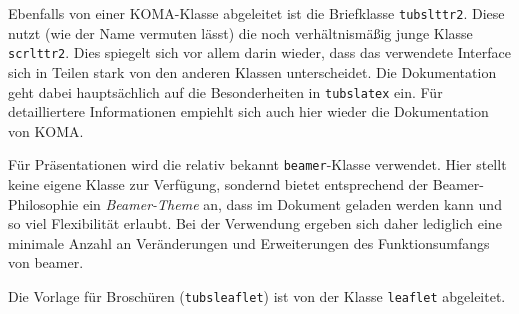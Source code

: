 Ebenfalls von einer KOMA-Klasse abgeleitet ist die Briefklasse
\texttt{tubslttr2}.
Diese nutzt (wie der Name vermuten lässt) die noch verhältnismäßig junge
Klasse \texttt{scrlttr2}. Dies spiegelt sich vor allem darin wieder, dass
das verwendete Interface sich in Teilen stark von den anderen Klassen unterscheidet. Die Dokumentation geht dabei hauptsächlich auf die Besonderheiten in \texttt{tubslatex} ein. Für detailliertere Informationen empiehlt sich auch hier wieder die Dokumentation von KOMA\cite{koma-skript}.

Für Präsentationen wird die relativ bekannt \texttt{beamer}-Klasse verwendet. Hier stellt \tubslatex keine eigene Klasse zur Verfügung, sondernd bietet entsprechend der Beamer-Philosophie ein \emph{Beamer-Theme} an, dass
im Dokument geladen werden kann und so viel Flexibilität erlaubt.
Bei der Verwendung ergeben sich daher lediglich eine minimale Anzahl an
Veränderungen und Erweiterungen des Funktionsumfangs von beamer.

Die Vorlage für Broschüren (\texttt{tubsleaflet}) ist
von der Klasse \texttt{leaflet} abgeleitet.\par


